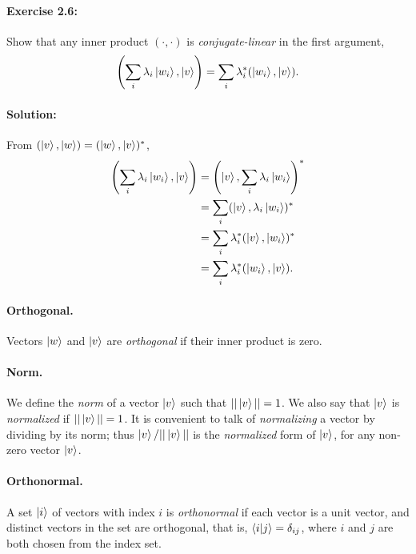 \documentclass{article}
\begin{document}
\paragraph{\cite{mikeandike} Exercise 2.6:} Show that any inner product $(\cdot, \cdot)$ is \emph{conjugate-linear} in the first argument, \begin{equation} \label{eq:conj-lin}
  \left(\sum_i \lambda_i\ket{w_i}, \ket{v}\right) = \sum_i \lambda_i^*(\ket{w_i}, \ket{v}).
\end{equation}

\paragraph{Solution:} From $(\ket{v}, \ket{w}) = (\ket{w}, \ket{v})^*$, \begin{align*}
  \left(\sum_i \lambda_i\ket{w_i}, \ket{v}\right) &= \left(\ket{v}, \sum_i \lambda_i\ket{w_i}\right)^* \\
    &= \sum_i (\ket{v}, \lambda_i\ket{w_i})^* \\
    &= \sum_i \lambda_i^* (\ket{v}, \ket{w_i})^* \\
    &= \sum_i \lambda_i^*(\ket{w_i}, \ket{v}).
\end{align*}

\paragraph{Orthogonal.} Vectors $\ket{w}$ and $\ket{v}$ are \emph{orthogonal} if their inner product is zero.

\paragraph{Norm.} We define the \emph{norm} of a vector $\ket{v}$ such that $||\ket{v}|| = 1$. We also say that $\ket{v}$ is \emph{normalized} if $||\ket{v}|| = 1$. It is convenient to talk of \emph{normalizing} a vector by dividing by its norm; thus $\ket{v}/||\ket{v}||$ is the \emph{normalized} form of $\ket{v}$, for any non-zero vector $\ket{v}$.

\paragraph{Orthonormal.} A set $\ket{i}$ of vectors with index $i$ is \emph{orthonormal} if each vector is a unit vector, and distinct vectors in the set are orthogonal, that is, $\braket{i}{j} = \delta_{ij}$, where $i$ and $j$ are both chosen from the index set.
\end{document}

